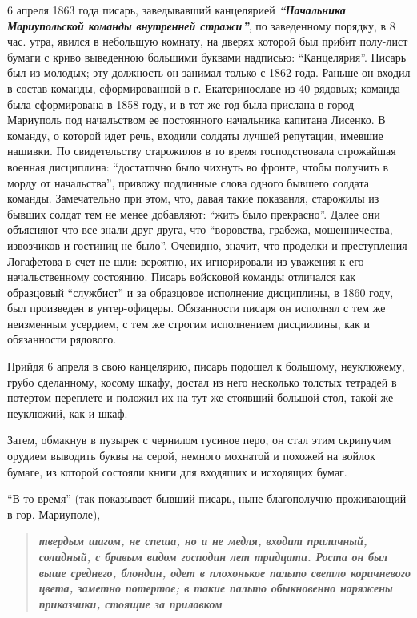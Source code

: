\documentclass[a4paper,20pt]{article}
\begin{document}
6 апреля 1863 года писарь, заведывавший канцелярией 
\textbf{\em ``Начальника Мариупольской команды внутренней стражи''},
по заведенному порядку, в 8 час. утра, явился в небольшую комнату, на дверях которой был прибит полу-лист
бумаги с криво выведенною большими буквами надписью: ``Канцелярия''. Писарь был из молодых; эту должность он занимал только с 1862 года.
Раньше он входил в состав команды, сформированной в г. Екатеринославе из 40 рядовых; команда была сформирована в 1858 году, и в тот же год была прислана в город Мариуполь под начальством ее постоянного начальника капитана Лисенко. 
В команду, о которой идет речь, входили солдаты лучшей репутации, имевшие нашивки. По свидетельству старожилов
в то время господствовала строжайшая военная
дисциплина: ``достаточно было чихнуть во фронте, чтобы
получить в морду от начальства'', привожу подлинные
слова одного бывшего солдата команды. Замечательно при
этом, что, давая такие показанля, старожилы из бывших
солдат тем не менее добавляют: ``жить было прекрасно''.
Далее они объясняют что все знали друг друга, что 
``воровства, грабежа, мошенничества, извозчиков и гостиниц
не было''. Очевидно, значит, что проделки и преступления Логафетова в счет не шли: вероятно, их
игнорировали из уважения к его начальственному состоянию.
Писарь войсковой команды отличался как образцовый ``службист'' и за образцовое
исполнение дисциплины, в 1860 году, был произведен в унтер-офицеры. Обязанности
писаря он исполнял с тем же неизменным усердием, с тем же строгим исполнением
дисциилины, как и обязанности рядового.

Прийдя 6 апреля в свою канцелярию, писарь подошел к большому, неуклюжему, грубо сделанному,
косому шкафу, достал из него несколько толстых тетрадей в потертом переплете и положил их на тут же
стоявший большой стол, такой же неуклюжий, как и шкаф.

Затем, обмакнув в пузырек с чернилом гусиное перо, он стал этим скрипучим
орудием выводить буквы на серой, немного мохнатой и похожей на войлок бумаге,
из которой состояли книги для входящих и исходящих бумаг.

``В то время'' (так показывает бывший писарь, ныне благополучно проживающий в гор. Мариуполе), 
\begin{quote}
\bfseries\em
твердым шагом, не спеша, но и не медля, входит приличный, 
солидный, с бравым видом господин лет тридцати. Роста он был выше среднего, блондин, одет в плохонькое пальто
светло коричневого цвета, заметно потертое; в такие пальто обыкновенно наряжены приказчики, стоящие за прилавком
\end{quote}
\end{document}
